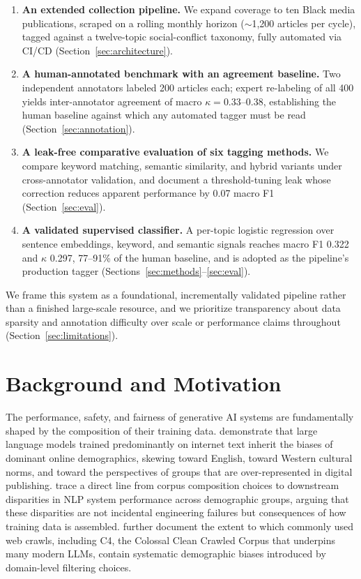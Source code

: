 \documentclass[letterpaper]{article}
\begin{document}
\begin{enumerate}
\item \textbf{An extended collection pipeline.} We expand coverage to
ten Black media publications, scraped on a rolling monthly horizon
($\sim$1{,}200 articles per cycle), tagged against a twelve-topic
social-conflict taxonomy, fully automated via CI/CD
(Section~\ref{sec:architecture}).
\item \textbf{A human-annotated benchmark with an agreement baseline.}
Two independent annotators labeled 200 articles each; expert re-labeling
of all 400 yields inter-annotator agreement of macro $\kappa =
0.33$--$0.38$, establishing the human baseline against which any
automated tagger must be read (Section~\ref{sec:annotation}).
\item \textbf{A leak-free comparative evaluation of six tagging
methods.} We compare keyword matching, semantic similarity, and hybrid
variants under cross-annotator validation, and document a
threshold-tuning leak whose correction reduces apparent performance by
0.07 macro F1 (Section~\ref{sec:eval}).
\item \textbf{A validated supervised classifier.} A per-topic logistic
regression over sentence embeddings, keyword, and semantic signals
reaches macro F1 0.322 and $\kappa$ 0.297, 77--91\% of the human
baseline, and is adopted as the pipeline's production tagger
(Sections~\ref{sec:methods}--\ref{sec:eval}).
\end{enumerate}

We frame this system as a foundational, incrementally validated pipeline
rather than a finished large-scale resource, and we prioritize
transparency about data sparsity and annotation difficulty over scale or
performance claims throughout (Section~\ref{sec:limitations}).

\section{Background and Motivation}
\label{sec:background}

The performance, safety, and fairness of generative AI systems are
fundamentally shaped by the composition of their training data.
\citet{bender2021} demonstrate that large language models trained
predominantly on internet text inherit the biases of dominant online
demographics, skewing toward English, toward Western cultural norms, and
toward the perspectives of groups that are over-represented in digital
publishing. \citet{blodgett2020} trace a direct line from corpus
composition choices to downstream disparities in NLP system performance
across demographic groups, arguing that these disparities are not
incidental engineering failures but consequences of how training data is
assembled. \citet{dodge2021} further document the extent to which
commonly used web crawls, including C4, the Colossal Clean Crawled
Corpus that underpins many modern LLMs, contain systematic demographic
biases introduced by domain-level filtering choices.
\end{document}
